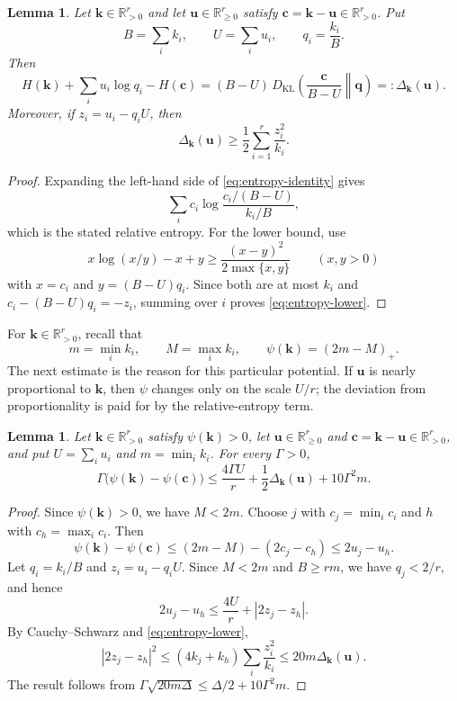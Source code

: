 \documentclass[11pt]{article}
\newtheorem{lemma}[theorem]{Lemma}
\theoremstyle{definition}
\newcommand{\R}{\mathbb R}
\newcommand{\kk}{\mathbf k}
\newcommand{\uu}{\mathbf u}
\newcommand{\cc}{\mathbf c}
\newcommand{\qq}{\mathbf q}
\newcommand{\Ent}{H}
\newcommand{\DG}{\Delta}
\newcommand{\pot}{\psi}
\newcommand{\KL}{D_{\mathrm{KL}}}
\begin{document}
\begin{lemma}\label{lem:entropy}
Let $\kk\in\R_{>0}^r$ and let $\uu\in\R_{\ge0}^r$ satisfy
$\cc=\kk-\uu\in\R_{>0}^r$.  Put
\[
 B=\sum_i k_i,\qquad U=\sum_i u_i,
 \qquad q_i=\frac{k_i}{B}.
\]
Then
\begin{equation}\label{eq:entropy-identity}
 \Ent(\kk)+\sum_i u_i\log q_i-\Ent(\cc)
 =(B-U)\,\KL\!\left(\frac{\cc}{B-U}\middle\|\qq\right)
 =:\DG_{\kk}(\uu).
\end{equation}
Moreover, if $z_i=u_i-q_iU$, then
\begin{equation}\label{eq:entropy-lower}
 \DG_{\kk}(\uu)\ge
 \frac12\sum_{i=1}^r\frac{z_i^2}{k_i}.
\end{equation}
\end{lemma}

\begin{proof}
Expanding the left-hand side of \eqref{eq:entropy-identity} gives
\[
 \sum_i c_i\log\frac{c_i/(B-U)}{k_i/B},
\]
which is the stated relative entropy.  For the lower bound, use
\[
 x\log(x/y)-x+y\ge \frac{(x-y)^2}{2\max\{x,y\}}
 \qquad(x,y>0)
\]
with $x=c_i$ and $y=(B-U)q_i$.  Since both are at most $k_i$ and
$c_i-(B-U)q_i=-z_i$, summing over $i$ proves \eqref{eq:entropy-lower}.
\end{proof}

For $\kk\in\R_{>0}^r$, recall that
\[
 m=\min_i k_i,\qquad M=\max_i k_i,
 \qquad \pot(\kk)=(2m-M)_+.
\]
The next estimate is the reason for this particular potential.  If $\uu$ is
nearly proportional to $\kk$, then $\pot$ changes only on the scale $U/r$;
the deviation from proportionality is paid for by the relative-entropy term.

\begin{lemma}\label{lem:potential}
Let $\kk\in\R_{>0}^r$ satisfy $\pot(\kk)>0$, let
$\uu\in\R_{\ge0}^r$ and $\cc=\kk-\uu\in\R_{>0}^r$, and put
$U=\sum_i u_i$ and $m=\min_i k_i$.  For every $\Gamma>0$,
\[
 \Gamma\bigl(\pot(\kk)-\pot(\cc)\bigr)
 \le \frac{4\Gamma U}{r}
      +\frac12\DG_{\kk}(\uu)+10\Gamma^2m.
\]
\end{lemma}

\begin{proof}
Since $\pot(\kk)>0$, we have $M<2m$.  Choose $j$ with
$c_j=\min_i c_i$ and $h$ with $c_h=\max_i c_i$.  Then
\[
 \pot(\kk)-\pot(\cc)
 \le (2m-M)-(2c_j-c_h)\le2u_j-u_h.
\]
Let $q_i=k_i/B$ and $z_i=u_i-q_iU$.  Since $M<2m$ and $B\ge rm$, we have
$q_j<2/r$, and hence
\[
 2u_j-u_h\le\frac{4U}{r}+|2z_j-z_h|.
\]
By Cauchy--Schwarz and \eqref{eq:entropy-lower},
\[
 |2z_j-z_h|^2
 \le(4k_j+k_h)\sum_i\frac{z_i^2}{k_i}
 \le20m\DG_{\kk}(\uu).
\]
The result follows from
$\Gamma\sqrt{20m\DG}\le \DG/2+10\Gamma^2m$.
\end{proof}
\end{document}
